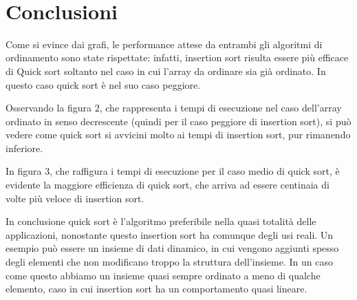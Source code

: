 \documentclass[
]{article}
\begin{document}
\
\newpage
\newpage
\hypertarget{conclusioni}{%


    \section{Conclusioni}\label{conclusioni}}

Come si evince dai grafi, le performance attese da entrambi gli
algoritmi di ordinamento sono state rispettate: infatti, insertion sort
risulta essere più efficace di Quick sort soltanto nel caso in cui
l'array da ordinare sia già ordinato. In questo caso quick sort è nel
suo caso peggiore.

Osservando la figura 2, che rappresenta i tempi di esecuzione nel caso
dell'array ordinato in senso decrescente (quindi per il caso peggiore di
insertion sort), si può vedere come quick sort si avvicini molto ai
tempi di insertion sort, pur rimanendo inferiore.

In figura 3, che raffigura i tempi di esecuzione per il caso medio di
quick sort, è evidente la maggiore efficienza di quick sort, che arriva
ad essere centinaia di volte più veloce di insertion sort.

In conclusione quick sort è l'algoritmo preferibile nella quasi totalità delle
applicazioni, nonostante questo insertion sort ha comunque degli
usi reali. Un esempio può essere un insieme di dati
dinamico, in cui vengono aggiunti spesso degli elementi che non
modificano troppo la struttura dell'insieme. In un caso come questo
abbiamo un insieme quasi sempre ordinato a meno di qualche elemento,
caso in cui insertion sort ha un comportamento quasi lineare.
\end{document}
